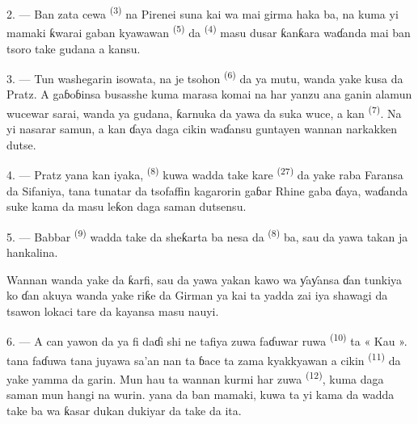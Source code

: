 2. --- Ban zata cewa  \textsuperscript{(3)} na
Pirenei suna kai wa  mai girma haka ba, na kuma yi mamaki
ƙwarai gaban kyawawan  \textsuperscript{(5)} da
 \textsuperscript{(4)} masu dusar ƙanƙara waɗanda
 mai ban tsoro take gudana a kansu.

\VUsaut{3.0mm}
\VUsaut{3.0mm}

3. --- Tun washegarin isowata, na je tsohon 
\textsuperscript{(6)} da ya mutu, wanda yake kusa da Pratz. A gaɓoɓinsa
busasshe kuma marasa komai na  har yanzu
ana ganin alamun wucewar  sarai, wanda ya
gudana, ƙarnuka da yawa da suka wuce, a kan 
\textsuperscript{(7)}. Na yi nasarar samun, a kan ɗaya daga cikin
 waɗansu guntayen wannan narkakken dutse.

4. --- Pratz yana kan iyaka,  \textsuperscript{(8)} kuwa
wadda take kare  \textsuperscript{(27)} da yake raba
Faransa da Sifaniya, tana tunatar da tsofaffin kagarorin gaɓar Rhine
gaba ɗaya, waɗanda suke kama da masu leƙon  daga saman
dutsensu.

5. --- Babbar  \textsuperscript{(9)} wadda take da sheƙarta
ba nesa da  \textsuperscript{(8)} ba, sau da yawa takan ja
hankalina.

Wannan  wanda  yake da
ƙarfi, sau da yawa yakan kawo wa ƴaƴansa ɗan tunkiya ko ɗan akuya
wanda yake riƙe da  Girman  ya
kai ta yadda zai iya shawagi da tsawon lokaci tare da kayansa masu
nauyi.

\VUsaut{3.0mm}
\VUsaut{3.0mm}

6. --- A can yawon da ya fi daɗi shi ne tafiya zuwa faɗuwar ruwa
\textsuperscript{(10)} ta « Kau ».  tana faɗuwa
tana juyawa sa’an nan ta ɓace ta zama kyakkyawan 
a cikin  \textsuperscript{(11)} da yake
yamma da garin. Mun hau ta wannan kurmi har zuwa  \textsuperscript{(12)}, kuma daga saman  mun
hangi  na wurin.  yana da ban
mamaki,  kuwa ta yi kama da wadda take ba wa ƙasar
dukan dukiyar da take da ita.

